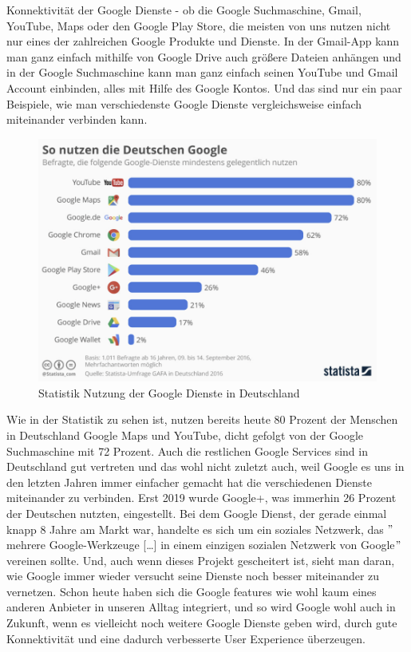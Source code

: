 Konnektivität der Google Dienste - ob die Google Suchmaschine, Gmail, YouTube, Maps oder den Google Play Store, die meisten von uns nutzen nicht nur eines der zahlreichen Google Produkte und Dienste.
In der Gmail-App kann man ganz einfach mithilfe von Google Drive auch größere Dateien anhängen und in der Google Suchmaschine kann man ganz einfach seinen YouTube und Gmail Account einbinden, alles mit Hilfe des Google Kontos.
Und das sind nur ein paar Beispiele, wie man verschiedenste Google Dienste vergleichsweise einfach miteinander verbinden kann.
\begin{figure}[h]
    \centering
    \includegraphics[width=120mm]{images/statistic_googleServices}
    \caption{Statistik Nutzung der Google Dienste in Deutschland}
    \label{fig:statisticGoogleServices}
\end{figure}  %
Wie in der Statistik zu sehen ist, nutzen bereits heute 80 Prozent der Menschen in Deutschland Google Maps und YouTube, dicht gefolgt von der Google Suchmaschine mit 72 Prozent.
Auch die restlichen Google Services sind in Deutschland gut vertreten und das wohl nicht zuletzt auch, weil Google es uns in den letzten Jahren immer einfacher gemacht hat die verschiedenen Dienste miteinander zu verbinden.
Erst 2019 wurde Google+, was immerhin 26 Prozent der Deutschen nutzten, eingestellt.
Bei dem Google Dienst, der gerade einmal knapp 8 Jahre am Markt war, handelte es sich um ein soziales Netzwerk, das \("\)mehrere Google-Werkzeuge [\ldots] in einem einzigen sozialen Netzwerk von Google\("\)\cite{JEC21} vereinen sollte.\cite{JEC21}
Und, auch wenn dieses Projekt gescheitert ist, sieht man daran, wie Google immer wieder versucht seine Dienste noch besser miteinander zu vernetzen.
Schon heute haben sich die Google features wie wohl kaum eines anderen Anbieter in unseren Alltag integriert, und so wird Google wohl auch in Zukunft, wenn es vielleicht noch weitere Google Dienste geben wird, durch gute Konnektivität und eine dadurch verbesserte User Experience überzeugen.\\

